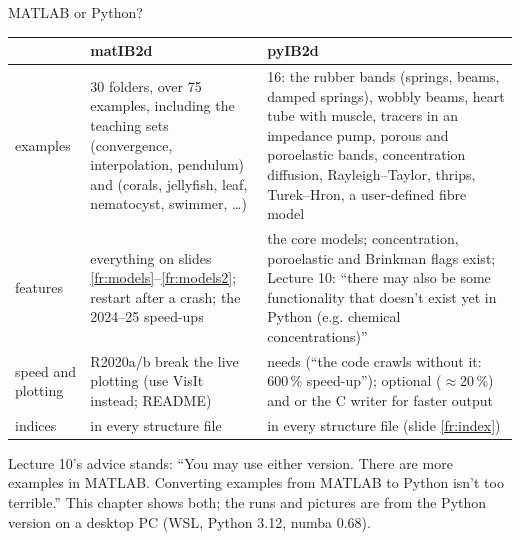 \documentclass[aspectratio=169,11pt]{beamer}
\begin{document}
\begin{frame}{MATLAB or Python?}
\label{fr:mat-vs-py}
\scriptsize
\begin{tabular}{@{}L{0.13\textwidth}L{0.40\textwidth}L{0.40\textwidth}@{}}
\toprule
 & \textbf{matIB2d} & \textbf{pyIB2d} \\
\midrule
examples & 30 folders, over 75 examples, including the teaching sets  (convergence, interpolation, pendulum) and  (corals, jellyfish, leaf, nematocyst, swimmer, \ldots) & 16: the rubber bands (springs, beams, damped springs), wobbly beams, heart tube with muscle, tracers in an impedance pump, porous and poroelastic bands, concentration diffusion, Rayleigh--Taylor, thrips, Turek--Hron, a user-defined fibre model \\
features & everything on slides \ref{fr:models}--\ref{fr:models2}; restart after a crash; the 2024--25 speed-ups & the core models; concentration, poroelastic and Brinkman flags exist; Lecture 10: ``there may also be some functionality that doesn't exist yet in Python (e.g. chemical concentrations)'' \\
speed and plotting & R2020a/b break the live plotting (use VisIt instead; README) & needs  (``the code crawls without it: 600\,\% speed-up''); optional  ($\approx$20\,\%) and  or the C writer for faster output \\
indices &  in every structure file &  in every structure file (slide \ref{fr:index}) \\
\bottomrule
\end{tabular}

\vspace{1mm}
\small Lecture 10's advice stands: ``You may use either version. There are more examples in MATLAB. Converting examples from MATLAB to Python isn't too terrible.'' This chapter shows both; the runs and pictures are from the Python version on a desktop PC (WSL, Python 3.12, numba 0.68).
\end{frame}
\end{document}
